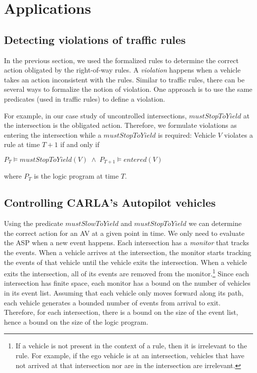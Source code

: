 \section{Applications}
\label{sec:applications}

\subsection{Detecting violations of traffic rules}
In the previous section,
we used the formalized rules to determine
the correct action obligated by the right-of-way rules.
A \emph{violation} happens when
a vehicle takes an action inconsistent with the rules.
Similar to traffic rules,
there can be several ways to formalize
the notion of violation.
One approach is to use the same predicates (used in traffic rules)
to define a violation.

For example,
in our case study of uncontrolled intersections,
$mustStopToYield$ at the intersection is the obligated action.
Therefore,
we formulate violations as
entering the intersection while a $mustStopToYield$ is required:
Vehicle $V$ violates a rule at time $T+1$
if and only if
\begin{center}
    $ P_T \models mustStopToYield(V) \; \land \; P_{T+1} \models entered(V) $
\end{center}
where $P_T$ is the logic program at time $T$.


\subsection{Controlling CARLA's Autopilot vehicles}
Using the predicate $mustSlowToYield$ and $mustStopToYield$
we can determine the correct action for an AV at a given point in time.
We only need to evaluate the ASP when a new event happens.
Each intersection has a \emph{monitor} that tracks the events.
When a vehicle arrives at the intersection, the monitor starts tracking the events of that vehicle until the vehicle exits the intersection.
When a vehicle exits the intersection, all of its events are removed from the monitor.\footnote{If a vehicle is not present in the context of a rule, then it is irrelevant to the rule.
For example,
if the ego vehicle is at an intersection,
vehicles that have not arrived at that intersection nor are in the intersection are irrelevant.}
Since each intersection has finite space, each monitor has a bound on the number of vehicles in its event list.
Assuming that each vehicle only moves forward along its path, each vehicle generates a bounded number of events from arrival to exit.
Therefore, for each intersection, there is a bound on the size of the event list, hence a bound on the size of the logic program.

